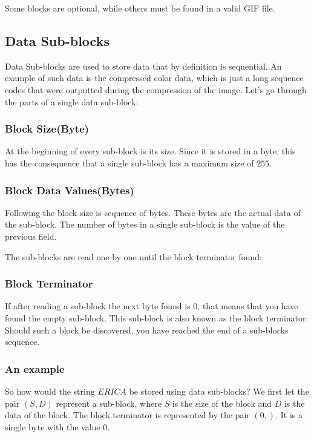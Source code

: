 Some blocks are optional, while others must be found in a valid GIF
file.

\subsection{Data Sub-blocks}
\label{sec:gif-data-sub-blocks}

Data Sub-blocks are used to store data that by definition is
sequential. An example of such data is the compressed color data,
which is just a long sequence codes that were outputted during the
compression of the image. Let's go through the parts of a single data
sub-block:

\subsubsection*{Block Size(Byte)}

At the beginning of every sub-block is its size. Since it is stored in
a byte, this has the consequence that a single sub-block has a maximum
size of $255$.

\subsubsection*{Block Data Values(Bytes)}

Following the block size is sequence of bytes. These bytes are the
actual data of the sub-block. The number of bytes in a single
sub-block is the value of the previous field.

The sub-blocks are read one by one until the block terminator found:

\subsubsection{Block Terminator}

If after reading a sub-block the next byte found is 0, that means
that you have found the empty sub-block. This sub-block is also
known as the block terminator. Should such a block be discovered, you
have reached the end of a sub-blocks sequence.

\subsubsection{An example}

So how would the string $ERICA$ be stored using data sub-blocks? We
first let the pair $(S,D)$ represent a sub-block, where $S$ is the
size of the block and $D$ is the data of the block. The block
terminator is represented by the pair $(0,)$. It is a single byte with
the value $0$.

